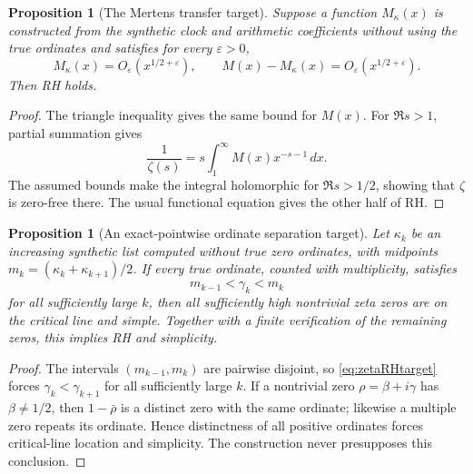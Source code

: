 \documentclass[11pt,reqno]{amsart}
\numberwithin{equation}{section}
\newtheorem{proposition}[theorem]{Proposition}
\begin{document}
\begin{proposition}[The Mertens transfer target]
\label{prop:MRHtarget}
Suppose a function $M_\kappa(x)$ is constructed from the
synthetic clock and arithmetic coefficients without using the
true ordinates and satisfies for every $\varepsilon>0$,
\[
M_\kappa(x)=O_\varepsilon(x^{1/2+\varepsilon}),\qquad
M(x)-M_\kappa(x)=O_\varepsilon(x^{1/2+\varepsilon}).
\]
Then RH holds.
\end{proposition}
\begin{proof}
The triangle inequality gives the same bound for $M(x)$.
For $\Re s>1$, partial summation gives
\[
\frac1{\zeta(s)}=s\int_1^\infty M(x)x^{-s-1}\,dx.
\]
The assumed bounds make the integral holomorphic for
$\Re s>1/2$, showing that $\zeta$ is zero-free there.
The usual functional equation gives the other half of RH.
\end{proof}

\begin{proposition}[An exact-pointwise ordinate separation target]
\label{prop:zetaRHtarget}
Let $\kappa_k$ be an increasing synthetic list computed without
true zero ordinates, with midpoints
$m_k=(\kappa_k+\kappa_{k+1})/2$. If every true ordinate,
counted with multiplicity, satisfies
\begin{equation}\label{eq:zetaRHtarget}
m_{k-1}<\gamma_k<m_k
\end{equation}
for all sufficiently large $k$, then all sufficiently high
nontrivial zeta zeros are on the critical line and simple.
Together with a finite verification of the remaining zeros,
this implies RH and simplicity.
\end{proposition}
\begin{proof}
The intervals $(m_{k-1},m_k)$ are pairwise disjoint, so
\eqref{eq:zetaRHtarget} forces
$\gamma_k<\gamma_{k+1}$ for all sufficiently large $k$.
If a nontrivial zero $\rho=\beta+i\gamma$ has
$\beta\ne1/2$, then $1-\bar\rho$ is a distinct zero
with the same ordinate; likewise a multiple zero repeats its
ordinate. Hence distinctness of all positive ordinates forces
critical-line location and simplicity. The construction never
presupposes this conclusion.
\end{proof}
\end{document}
